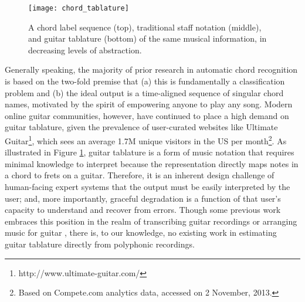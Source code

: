 \begin{figure}[t!]

  \centering
  \centerline{\texttt{[image: chord\_tablature]}}
\caption{A chord label sequence (top), traditional staff notation (middle), and guitar tablature (bottom) of the same musical information, in decreasing levels of abstraction.}
\label{fig:different_notation}
%
\end{figure}


Generally speaking, the majority of prior research in automatic chord recognition is based on the two-fold premise that (a) this is fundamentally a classification problem and (b) the ideal output is a time-aligned sequence of singular chord names, motivated by the spirit of empowering anyone to play any song.
Modern online guitar communities, however, have continued to place a high demand on guitar tablature, given the prevalence of user-curated websites like Ultimate Guitar\footnote{http://www.ultimate-guitar.com/}, which sees an average 1.7M unique visitors in the US per month\footnote{Based on Compete.com analytics data, accessed on 2 November, 2013.}.
As illustrated in Figure \ref{fig:different_notation}, guitar tablature is a form of music notation that requires minimal knowledge to interpret because the representation directly maps notes in a chord to frets on a guitar.
Therefore, it is an inherent design challenge of human-facing expert systems that the output must be easily interpreted by the user; and, more importantly, graceful degradation is a function of that user's capacity to understand and recover from errors.
Though some previous work embraces this position in the realm of transcribing guitar recordings \cite{Barbancho2012} or arranging music for guitar \cite{Hori2013}, there is, to our knowledge, no existing work in estimating guitar tablature directly from polyphonic recordings.



